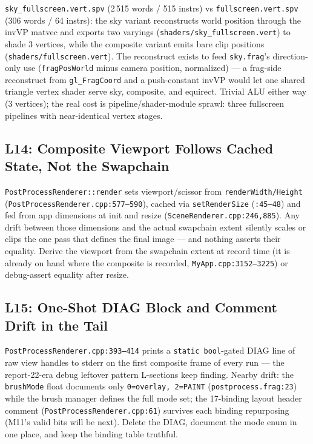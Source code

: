 \documentclass[11pt,a4paper]{article}
\begin{document}
\texttt{sky\_fullscreen.vert.spv} (2\,515 words / 515 instrs) vs
\texttt{fullscreen.vert.spv} (306 words / 64 instrs): the sky variant
reconstructs world position through the invVP matvec and exports two
varyings (\texttt{shaders/sky\_fullscreen.vert}) to shade 3 vertices, while
the composite variant emits bare clip positions
(\texttt{shaders/fullscreen.vert}). The reconstruct exists to feed
\texttt{sky.frag}'s direction-only use (\texttt{fragPosWorld} minus camera
position, normalized) --- a frag-side reconstruct from \texttt{gl\_FragCoord}
and a push-constant invVP would let one shared triangle vertex shader serve
sky, composite, and equirect. Trivial ALU either way (3 vertices); the real
cost is pipeline/shader-module sprawl: three fullscreen pipelines with
near-identical vertex stages.

\subsection{L14: Composite Viewport Follows Cached State, Not the Swapchain}

\texttt{PostProcessRenderer::render} sets viewport/scissor from
\texttt{renderWidth/Height} (\texttt{PostProcessRenderer.cpp:577--590}),
cached via \texttt{setRenderSize} (\texttt{:45--48}) and fed from app
dimensions at init and resize (\texttt{SceneRenderer.cpp:246,885}). Any
drift between those dimensions and the actual swapchain extent silently
scales or clips the one pass that defines the final image --- and nothing
asserts their equality. Derive the viewport from the swapchain extent at
record time (it is already on hand where the composite is recorded,
\texttt{MyApp.cpp:3152--3225}) or debug-assert equality after resize.

\subsection{L15: One-Shot DIAG Block and Comment Drift in the Tail}

\texttt{PostProcessRenderer.cpp:393--414} prints a \texttt{static
bool}-gated DIAG line of raw view handles to stderr on the first composite
frame of every run --- the report-22-era debug leftover pattern L-sections
keep finding. Nearby drift: the \texttt{brushMode} float documents only
\texttt{0=overlay, 2=PAINT} (\texttt{postprocess.frag:23}) while the brush
manager defines the full mode set; the 17-binding layout header comment
(\texttt{PostProcessRenderer.cpp:61}) survives each binding repurposing
(M11's valid bits will be next). Delete the DIAG, document the mode enum in
one place, and keep the binding table truthful.
\end{document}
